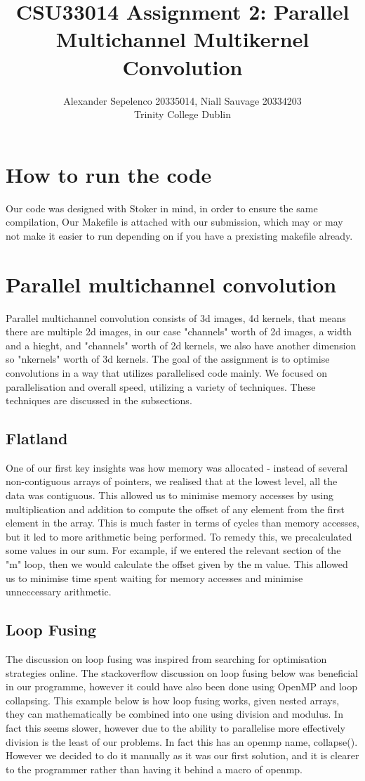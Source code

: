 \documentclass[12pt,fleqn,leqno,letterpaper]{article}
\title{CSU33014 Assignment 2: Parallel Multichannel Multikernel Convolution}
\author{Alexander Sepelenco 20335014, Niall Sauvage 20334203\\
  \small{Trinity College Dublin}
}
\begin{document}
\maketitle

\section{How to run the code}
Our code was designed with Stoker in mind, in order to ensure the
same compilation, Our Makefile is attached with our submission,
which may or may not make it easier to run depending on if you have
a prexisting makefile already. 

\section{Parallel multichannel convolution}
Parallel multichannel convolution consists of 3d images, 4d kernels, that means there
are multiple 2d images, in our case "channels" worth of 2d images, a width and a hieght, 
and "channels" worth of 2d kernels, we also have another dimension so "nkernels" worth of 3d kernels. 
The goal of the assignment is to optimise convolutions in a way that utilizes parallelised code mainly.
We focused on parallelisation and overall speed, utilizing a variety of techniques.
These techniques are discussed in the subsections.

\subsection{Flatland}
One of our first key insights was how memory was allocated - instead of several non-contiguous arrays of
pointers, we realised that at the lowest level, all the data was contiguous. This allowed us to minimise 
memory accesses by using multiplication and addition to compute the offset of any element from the first 
element in the array. This is much faster in terms of cycles than memory accesses, but it led to more 
arithmetic being performed. To remedy this, we precalculated some values in our sum. For example, if we
entered the relevant section of the "m" loop, then we would calculate the offset given by the m value. 
This allowed us to minimise time spent waiting for memory accesses and minimise unneccessary arithmetic.

\subsection{Loop Fusing}
The discussion on loop fusing was inspired from searching for optimisation strategies online.
The stackoverflow discussion on loop fusing below was beneficial in our programme, however it could
have also been done using OpenMP and loop collapsing. This example below is how loop fusing works, 
given nested arrays, they can mathematically be combined into one using division and modulus. 
In fact this seems slower, however due to the ability to parallelise more effectively division is 
the least of our problems. In fact this has an openmp name, collapse(). However we decided to do it 
manually as it was our first solution, and it is clearer to the programmer rather than having it behind a macro of openmp.
\end{document}

